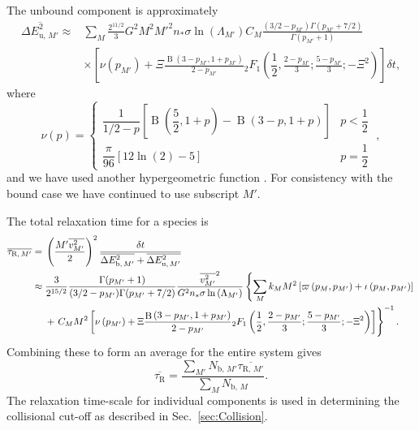 \documentclass[useAMS,usedcolumn,usegraphicx,usenatbib]{mn2e}
\newcommand{\secref}[1]{Sec.~\ref{sec:#1}}
\DeclareMathOperator{\Beta}{B}
\newcommand{\recip}[1]{\ensuremath{\dfrac{1}{#1}}}
\begin{document}
\begin{onecolumn}
The unbound component is approximately
\begin{align}
\overline{\Delta E^2_{\mathrm{u},\,M'}} \approx {} & \sum_M\frac{2^{11/2}}{3}G^2M^2{M'}^2n_\ast\sigma\ln\left(\Lambda_{M'}\right) C_M \frac{(3/2 - p_{M'})\Gamma(p_{M'} + 7/2)}{\Gamma(p_{M'} + 1)} \nonumber \\
  & \times \left[\nu\left(p_{M'}\right) + \Xi\frac{\Beta\left(3-p_{M'},1+p_{M'}\right)}{2-p_{M'}}{_2F_1}\left(\recip{2},\frac{2-p_{M'}}{3};\frac{5-p_{M'}}{3};-\Xi^2\right) \right] \delta t,
\end{align}
where
\begin{equation}
\nu(p) = \begin{cases} \recip{1/2 - p}\left[\Beta\left(\dfrac{5}{2},1+p\right) - \Beta\left(3-p,1+p\right)\right] & p < \recip{2} \\
\dfrac{\pi}{96}\left[12 \ln(2) - 5\right] & p = \recip{2}
\end{cases} \; ,
\end{equation}
and we have used another hypergeometric function \citep[15.6.1]{Olver2010}. For consistency with the bound case we have continued to use subscript $M'$. 

The total relaxation time for a species is
\begin{align}
\overline{\tau_{\mathrm{R,}\,M'}} = {} & \left(\frac{{M'}\overline{v_{M'}^2}}{2}\right)^2\frac{\delta t}{\overline{\Delta E^2_{\mathrm{b},\,M'}} + \overline{\Delta E^2_{\mathrm{u},\,M'}}} \\
 \approx {} & \frac{3}{2^{15/2}}\frac{\Gamma(p_{M'} + 1)}{(3/2 - p_{M'})\Gamma(p_{M'} + 7/2)}\frac{\overline{v_{M'}^2}^2}{G^2n_\ast\sigma\ln\left(\Lambda_{M'}\right)} \left\{\sum_M k_M M^2 \left[ \varpi\left(p_M,p_{M'}\right) + \iota \left(p_M,p_{M'}\right)\right] \right. \nonumber \\*
  & + \left. \vphantom{ \left[ \frac{p_{M'}^2\left(6 + 9p_M + 8p_M^2\right)}{210}\right]} C_M M^2 \left[\nu\left(p_{M'}\right) + \Xi\frac{\Beta\left(3-p_{M'},1+p_{M'}\right)}{2-p_{M'}}{_2F_1}\left(\recip{2},\frac{2-p_{M'}}{3};\frac{5-p_{M'}}{3};-\Xi^2\right)\right]\right\}^{-1}.
\end{align}
Combining these to form an average for the entire system gives
\begin{equation}
\overline{\tau_{\mathrm{R}}} = \frac{\sum_{M'}N_{\mathrm{b,}\,M'}\overline{\tau_{\mathrm{R,}\,M'}}}{\sum_{M}N_{\mathrm{b,}\,M}}.
\label{eq:system-relax}
\end{equation}
The relaxation time-scale for individual components is used in determining the collisional cut-off as described in \secref{Collision}.


\end{onecolumn}
\end{document}
